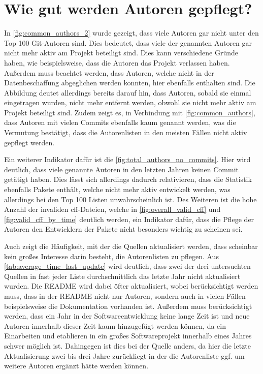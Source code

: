 \section{Wie gut werden Autoren gepflegt?}
\label{sec:autoren_pflege_diskussion}
In \autoref{fig:common_authors_2} wurde gezeigt, dass viele Autoren gar nicht unter den Top 100 Git-Autoren sind.
Dies bedeutet, dass viele der genannten Autoren gar nicht mehr aktiv am Projekt beteiligt sind.
Dies kann verschiedene Gründe haben, wie beispielsweise, dass die Autoren das Projekt verlassen haben.
Außerdem muss beachtet werden, dass Autoren, welche nicht in der Datenbeschaffung abgeglichen werden konnten, hier ebenfalls enthalten sind.
Die Abbildung deutet allerdings bereits darauf hin, dass Autoren, sobald sie einmal eingetragen wurden, nicht mehr entfernt werden, obwohl sie nicht mehr aktiv am Projekt beteiligt sind.
Zudem zeigt es, in Verbindung mit \autoref{fig:common_authors}, dass Autoren mit vielen Commits ebenfalls kaum genannt werden, was die Vermutung bestätigt, dass die Autorenlisten in den meisten Fällen nicht aktiv gepflegt werden.

Ein weiterer Indikator dafür ist die \autoref{fig:total_authors_no_commits}.
Hier wird deutlich, dass viele genannte Autoren in den letzten Jahren keinen Commit getätigt haben.
Dies lässt sich allerdings dadurch relativieren, dass die Statistik ebenfalls Pakete enthält, welche nicht mehr aktiv entwickelt werden, was allerdings bei den Top 100 Listen unwahrscheinlich ist.
Des Weiteren ist die hohe Anzahl der invaliden \gls{cff}-Dateien, welche in \autoref{fig:overall_valid_cff} und \autoref{fig:valid_cff_by_time} deutlich werden, ein Indikator dafür, dass die Pflege der Autoren den Entwicklern der Pakete nicht besonders wichtig zu scheinen sei.

Auch zeigt die Häufigkeit, mit der die Quellen aktualisiert werden, dass scheinbar kein großes Interesse darin besteht, die Autorenlisten zu pflegen.
Aus \autoref{tab:average_time_last_update} wird deutlich, dass zwei der drei untersuchten Quellen in fast jeder Liste durchschnittlich das letzte Jahr nicht aktualisiert wurden.
Die README wird dabei öfter aktualisiert, wobei berücksichtigt werden muss, dass in der README nicht nur Autoren, sondern auch in vielen Fällen beispielsweise die Dokumentation vorhanden ist.
Außerdem muss berücksichtigt werden, dass ein Jahr in der Softwareentwicklung keine lange Zeit ist und neue Autoren innerhalb dieser Zeit kaum hinzugefügt werden können, da ein Einarbeiten und etablieren in ein großes Softwareprojekt innerhalb eines Jahres schwer möglich ist.
Dahingegen ist dies bei der  Quelle anders, da hier die letzte Aktualisierung zwei bis drei Jahre zurückliegt in der die Autorenliste ggf. um weitere Autoren ergänzt hätte werden können.

